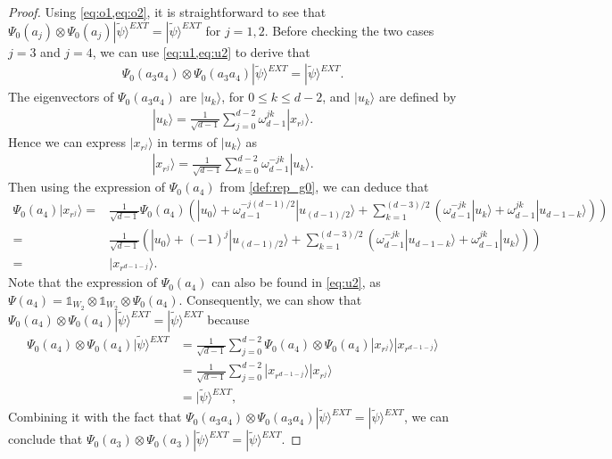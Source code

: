 \documentclass[11pt,letterpaper]{article}
\newcommand{\ket}[1]{|#1\rangle}
\newcommand{\x}{\otimes}
\newcommand{\1}{\mathbb{1}}
\newcommand{\EXT}{EXT}
\newcommand{\tpsi}{\tilde{\psi}}
\theoremstyle{definition}
\begin{document}
\begin{proof}
	
	Using \cref{eq:o1,eq:o2}, it is straightforward to see that $\Psi_0(a_j)\x \Psi_0(a_j) \ket{\tpsi}^{\EXT} = \ket{\tpsi}^{\EXT}$ for $j = 1,2$.
	Before checking the two cases $j=3$ and $j=4$, we can use \cref{eq:u1,eq:u2} to derive that
	\begin{align*}
		\Psi_0(a_3 a_4) \x\Psi_0(a_3 a_4) \ket{\tpsi}^{\EXT} = \ket{\tpsi}^{\EXT}.
	\end{align*}
	The eigenvectors of $\Psi_0(a_3 a_4)$ are $\ket{u_k}$,
	for $0 \leq k \leq d-2$,
	and $\ket{u_k}$ are defined by
    \begin{align*}
        \ket{u_k} = \frac{1}{\sqrt{d-1}} \sum_{j=0}^{d-2} \omega_{d-1}^{jk} \ket{x_{r^j}}.
    \end{align*}
    Hence we can express $\ket{x_{r^j}}$ in terms of $\ket{u_k}$ as 
    \begin{align*}
        \ket{x_{r^j}} = \frac{1}{\sqrt{d-1}} \sum_{k=0}^{d-2} \omega_{d-1}^{-jk} \ket{u_k}.
    \end{align*}
    Then using the expression of $\Psi_0(a_4)$ from \cref{def:rep_g0},
    we can deduce that
    \begin{align*}
        \Psi_0(a_4) \ket{x_{r^j}} =& \frac{1}{\sqrt{d-1}} \Psi_0(a_4) \left(\ket{u_0} + \omega_{d-1}^{-j(d-1)/2}\ket{u_{(d-1)/2}}  + 
        \sum_{k=1}^{(d-3)/2} (\omega_{d-1}^{-jk} \ket{u_k} + \omega_{d-1}^{jk} \ket{u_{d-1-k}})\right) \\
        =&\frac{1}{\sqrt{d-1}} \left(\ket{u_0} + (-1)^j\ket{u_{(d-1)/2}}  + 
        \sum_{k=1}^{(d-3)/2} (\omega_{d-1}^{-jk} \ket{u_{d-1-k}} + \omega_{d-1}^{jk} \ket{u_{k}})\right) \\
        =& \ket{x_{r^{d-1-j}}}.
    \end{align*}
    Note that the expression of $\Psi_0(a_4)$ can also be found in
    \cref{eq:u2}, as $\Psi(a_4) = \1_{W_2} \x \1_{W_2} \x \Psi_0(a_4)$.
    Consequently, we can show that $\Psi_0(a_4) \x \Psi_0(a_4) \ket{\tpsi}^{\EXT} = \ket{\tpsi}^{\EXT}$ 
    because
    \begin{align*}
        \Psi_0(a_4) \x \Psi_0(a_4) \ket{\tpsi}^{\EXT} &= \frac{1}{\sqrt{d-1}}  \sum_{j=0}^{d-2} \Psi_0(a_4)\x  \Psi_0(a_4) \ket{x_{r^j}} \ket{x_{r^{d-1-j}}} \\
        &= \frac{1}{\sqrt{d-1}} \sum_{j=0}^{d-2} \ket{x_{r^{d-1-j}}} \ket{x_{r^{j}}}\\ &=\ket{\tpsi}^{\EXT},
    \end{align*}
	Combining it with the fact that $\Psi_0(a_3 a_4) \x \Psi_0(a_3 a_4) \ket{\tpsi}^{\EXT} = \ket{\tpsi}^{\EXT}$, we can conclude that
	$\Psi_0(a_3) \x \Psi_0(a_3) \ket{\tpsi}^{\EXT} = \ket{\tpsi}^{\EXT}$.
\end{proof}
\end{document}
